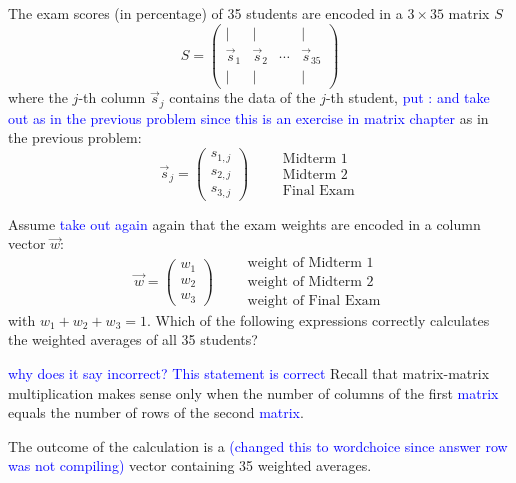 \documentclass{ximera}
\author{Tae Eun Kim}
\begin{document}
\begin{exercise}
  The exam scores (in percentage) of 35 students are encoded in a
  $3 \times 35$ matrix $S$
  \[
    S =
    \begin{pmatrix}
      |&|&&| \\
      \vec{s}_1 & \vec{s}_2 & \cdots & \vec{s}_{35} \\
      |&|&&|
    \end{pmatrix}
  \]
  where the $j$-th column $\vec{s}_j$ contains the data of the $j$-th
  student, \textcolor{blue}{put : and take out as in the previous problem since this is an exercise in matrix chapter} as in the previous problem:
  \[
    \vec{s}_j =
    \begin{pmatrix}
      s_{1,j}\\ s_{2,j} \\ s_{3,j}
    \end{pmatrix}
    \qquad
    \begin{array}{l}
      \text{Midterm 1}\\
      \text{Midterm 2}\\
      \text{Final Exam}
    \end{array}
  \]

  Assume \textcolor{blue}{take out again} again that the exam weights are encoded in a column
  vector $\vec{w}$:
  \[
    \vec{w} =
    \begin{pmatrix}
      w_1\\ w_2\\ w_3
    \end{pmatrix}
    \qquad
    \begin{array}{l}
      \text{weight of Midterm 1}\\
      \text{weight of Midterm 2}\\
      \text{weight of Final Exam}
    \end{array}
  \]
  with $w_1 + w_2 + w_3 = 1$. Which of the following expressions
  correctly calculates the weighted averages of all 35 students?
  \begin{multipleChoice}
  \end{multipleChoice}
  \begin{feedback}[incorrect]
    \textcolor{blue}{why does it say incorrect? This statement is correct} Recall that matrix-matrix multiplication makes sense only when the
    number of columns of the first \textcolor{blue}{matrix} equals the number of rows of the
    second \textcolor{blue}{matrix}.
  \end{feedback}
  \begin{prompt}
    The outcome of the calculation is a \textcolor{blue}{(changed this to wordchoice since answer row was not compiling)}  vector containing
    35 weighted averages.
  \end{prompt}
\end{exercise}
\end{document}
